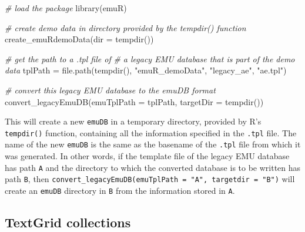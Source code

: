 \documentclass[
]{book}
\newenvironment{Shaded}{\begin{snugshade}}{\end{snugshade}}
\newcommand{\AttributeTok}[1]{\textcolor[rgb]{0.77,0.63,0.00}{#1}}
\newcommand{\CommentTok}[1]{\textcolor[rgb]{0.56,0.35,0.01}{\textit{#1}}}
\newcommand{\FunctionTok}[1]{\textcolor[rgb]{0.00,0.00,0.00}{#1}}
\newcommand{\NormalTok}[1]{#1}
\newcommand{\OtherTok}[1]{\textcolor[rgb]{0.56,0.35,0.01}{#1}}
\newcommand{\StringTok}[1]{\textcolor[rgb]{0.31,0.60,0.02}{#1}}
\begin{document}
\begin{Shaded}
\begin{Highlighting}[]
\CommentTok{\# load the package}
\FunctionTok{library}\NormalTok{(emuR)}

\CommentTok{\# create demo data in directory provided by the tempdir() function}
\FunctionTok{create\_emuRdemoData}\NormalTok{(}\AttributeTok{dir =} \FunctionTok{tempdir}\NormalTok{())}

\CommentTok{\# get the path to a .tpl file of}
\CommentTok{\# a legacy EMU database that is part of the demo data}
\NormalTok{tplPath }\OtherTok{=} \FunctionTok{file.path}\NormalTok{(}\FunctionTok{tempdir}\NormalTok{(),}
                    \StringTok{"emuR\_demoData"}\NormalTok{,}
                    \StringTok{"legacy\_ae"}\NormalTok{,}
                    \StringTok{"ae.tpl"}\NormalTok{)}

\CommentTok{\# convert this legacy EMU database to the emuDB format}
\FunctionTok{convert\_legacyEmuDB}\NormalTok{(}\AttributeTok{emuTplPath =}\NormalTok{ tplPath, }
                    \AttributeTok{targetDir =} \FunctionTok{tempdir}\NormalTok{())}
\end{Highlighting}
\end{Shaded}

This will create a new \texttt{emuDB} in a temporary directory, provided by R's \texttt{tempdir()} function, containing all the information specified in the \texttt{.tpl} file. The name of the new \texttt{emuDB} is the same as the basename of the \texttt{.tpl} file from which it was generated. In other words, if the template file of the legacy EMU database has path \texttt{A} and the directory to which the converted database is to be written has path \texttt{B}, then \texttt{convert\_legacyEmuDB(emuTplPath\ =\ "A",\ targetdir\ =\ "B")} will create an \texttt{emuDB} directory in \texttt{B} from the information stored in \texttt{A}.

\hypertarget{textgrid-collections}{%
\subsection{TextGrid collections}\label{textgrid-collections}}
\end{document}
